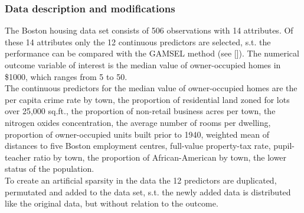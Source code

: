 \documentclass[12pt,letterpaper]{article}
\numberwithin{equation}{subsection}
\begin{document}
\subsubsection{Data description and modifications}
The Boston housing data set consists of 506 observations with 14 attributes. Of these 14 attributes only the 12 continuous predictors are selected, s.t. the performance can be compared with the GAMSEL method (see [\cite{gamsel}]). The numerical outcome variable of interest is the median value of owner-occupied homes in \$1000, which ranges from 5 to 50.  \\
The continuous predictors for the median value of owner-occupied homes are the per capita crime rate by town, the proportion of residential land zoned for lots over 25,000 sq.ft., the proportion of non-retail business acres per town, 
the nitrogen oxides concentration, the average number of rooms per dwelling, 
proportion of owner-occupied units built prior to 1940, weighted mean of distances to five Boston employment centres, full-value property-tax rate, 
pupil-teacher ratio by town, the proportion of African-American by town, the lower status of the population. \\
To create an artificial sparsity in the data the 12 predictors are duplicated, permutated and added to the data set, s.t. the newly added data is distributed like the original data, but without relation to the outcome.
\label{sec:bndd}
\end{document}
